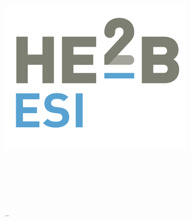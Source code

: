 
\thispagestyle{empty}

\begin{minipage}[t]{3cm}
	\includegraphics[scale=1]{image/esi-logo}
\end{minipage}
\quad
\begin{minipage}[t]{7cm}
	\vspace{-4\baselineskip}
	\sffamily\large
	\textbf{\ecole\\\entite\\\etude}
	\bigskip\\
	\entiteadresse\\\entitetel{} – \entitemail
\end{minipage}

\vfill
\begin{center}
	\sffamily
	\LARGE\ue\\
	\Huge\cours
	\bigskip\\
	\Large\annee
\end{center}
\vfill

\begin{center}
	\Large\auteur
\end{center}
